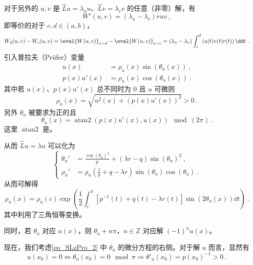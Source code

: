 对于另外的 $u, v$ 是 $\hat L u = \lambda_u u$、$\hat L v = \lambda_v v$ 的任意（非零）解，有
\begin{equation}
W'(u, v) = (\lambda_u - \lambda_v) r u v~,
\end{equation}
即等价的对于 $c, d \in (a, b)$，
\begin{equation}
W_d(u, v) - W_c(u, v) = \eval{W(u, v)}_{x = d} - \eval{W(u, v)}_{x = c} = (\lambda_u - \lambda_v) \int_c^d \left(u(t) v(t) r(t) \right) \dd t ~.
\end{equation}
引入普拉夫（Prüfer）变量
\begin{equation}
\begin{aligned}
u(x) &= \rho_u(x) \sin(\theta_u(x)) ~,\\
p(x) u'(x) &= \rho_u(x) \cos(\theta_u(x)) ~.
\end{aligned}
\end{equation}
其中若 $u(x)$、$p(x)u'(x)$ 总不同时为 $0$ 且 $u$ 可微则
\begin{equation}
\rho_u(x) = \sqrt{u^2(x) + \left(p(x) u'(x)\right)^2} > 0 ~.
\end{equation}
另外 $\theta_u$ 被要求为正的且
\begin{equation}
\theta_u(x) = \operatorname{atan2}(p(x)u'(x), u(x)) \mod (2\pi) ~.
\end{equation}
这里 $\operatorname{atan2}$ 是。

从而 $\hat L u = \lambda u$ 可以化为
\begin{equation}\label{eq_SLzPro_2}
\left\{
    \begin{aligned}
    \theta_u' &= \frac{\cos(\theta_u)^2}{p} + (\lambda r - q) \sin(\theta_u)^2 ~,\\
    \rho_u' &= \rho_u(\frac{1}{p} + q - \lambda r) \sin(\theta_u) \cos(\theta_u)~.
    \end{aligned}
\right.
\end{equation}
从而可解得
\begin{equation}
\rho_u(x) = \rho_u(c) \exp(\frac{1}{2} \int_c^x \left[p^{-1}(t) + q(t) - \lambda r(t)\right]\sin\left(2 \theta_u(x)\right) \dd t) ~.
\end{equation}
其中利用了三角恒等变换。

同时，若 $\theta_u$ 对应 $u(x)$，则 $\theta_u + n \pi$，$n \in \mathbb Z$ 对应解 $\left(-1\right)^{n} u(x)$。

现在，我们考虑\autoref{eq_SLzPro_2} 中 $\theta_u$ 的微分方程的右侧。对于解 $u$ 而言，显然有
\begin{equation}
u(x_0) = 0 \Leftrightarrow \theta_u(x_0) = 0 \mod \pi \Rightarrow \theta'_u(x_0) = p(x_0)^{-1} > 0~.
\end{equation}


